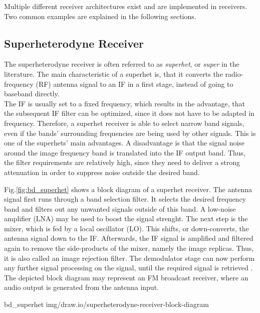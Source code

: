 Multiple different receiver architectures exist and are implemented in receivers.
Two common examples are explained in the following sections.

\subsection{Superheterodyne Receiver}

The superheterodyne receiver is often referred to as \textit{superhet}, or \textit{super} in the literature.
The main characteristic of a superhet is, that it converts the radio-frequency (RF) antenna signal to an IF in a first stage, instead of going to baseband directly.\\

The IF is usually set to a fixed frequency, which results in the advantage, that the subsequent IF filter can be optimized, since it does not have to be adapted in frequency.
Therefore, a superhet receiver is able to select narrow band signals, even if the bands' surrounding frequencies are being used by other signals.
This is one of the superhets' main advantages.
A disadvantage is that the signal noise around the image frequency band is translated into the IF output band.
Thus, the filter requirements are relatively high, since they need to deliver a strong attenuation in order to suppress noise outside the desired band.

Fig.\ref{fig:bd_superhet} shows a block diagram of a superhet receiver.
The antenna signal first runs through a band selection filter.
It selects the desired frequency band and filters out any unwanted signals outside of this band.
A low-noise amplifier (LNA) may be used to boost the signal strenght.
The next step is the mixer, which is fed by a local oscillator (LO).
This shifts, or down-converts, the antenna signal down to the IF.
Afterwards, the IF signal is amplified and filtered again to remove the side-products of the mixer, namely the image replicas.
Thus, it is also called an image rejection filter.
The demodulator stage can now perform any further signal processing on the signal, until the required signal is retrieved \cite{PassosFábio2020AHSo}.\\

The depicted block diagram may represent an FM broadcast receiver, where an audio output is generated from the antenna input.

 {bd_superhet} {img/draw.io/superheterodyne-receiver-block-diagram}

